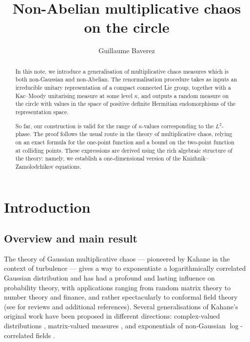 \documentclass[12pt,a4paper]{amsart}
\title[Non-Abelian multiplicative chaos]{Non-Abelian multiplicative chaos on the circle}
\author{Guillaume Baverez}
\date{}
\numberwithin{equation}{section}
\newcounter{exa}
\theoremstyle{remark}
\theoremstyle{definition}
\begin{document}
\begin{abstract}
In this note, we introduce a generalisation of multiplicative chaos measures which is both non-Gaussian and non-Abelian. The renormalisation procedure takes as inputs an irreducible unitary representation of a compact connected Lie group, together with a Kac--Moody unitarising measure at some level $\kappa$, and outputs a random measure on the circle with values in the space of positive definite Hermitian endomorphisms of the representation space.

So far, our construction is valid for the range of $\kappa$-values corresponding to the $L^2$-phase. The proof follows the usual route in the theory of multiplicative chaos, relying on an exact formula for the one-point function and a bound on the two-point function at colliding points. These expressions are derived using the rich algebraic structure of the theory: namely, we establish a one-dimensional version of the Knizhnik--Zamolodchikov equations.
\end{abstract}

\maketitle


\section{Introduction}

    \subsection{Overview and main result}
The theory of Gaussian multiplicative chaos --- pioneered by Kahane in the context of turbulence \cite{Kahane85} --- gives a way to exponentiate a logarithmically correlated Gaussian distribution and has had a profound and lasting influence on probability theory, with applications ranging from random matrix theory to number theory and finance, and rather spectacularly to conformal field theory (see \cite{RV14-review,RV25-proceedings,Sheffield_proceedings,BP25} for reviews and additional references). Several generalisations of Kahane's original work have been proposed in different directions: complex-valued distributions \cite{LRV15,JSW20}, matrix-valued measures \cite{CRV13}, and exponentials of non-Gaussian $\log$-correlated fields \cite{Jego20,ABJL23}. 
\end{document}
